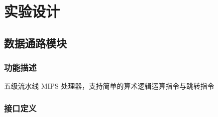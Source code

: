 \section{实验设计}

\subsection{数据通路模块}\label{sub:hazard}
\subsubsection{功能描述}
五级流水线 MIPS 处理器，支持简单的算术逻辑运算指令与跳转指令

\newpage
\subsubsection{接口定义}
